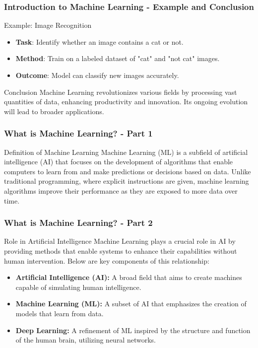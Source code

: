 \documentclass[aspectratio=169]{beamer}
\begin{document}
\begin{frame}[fragile]
    \frametitle{Introduction to Machine Learning - Example and Conclusion}
    \begin{block}{Example: Image Recognition}
        \begin{itemize}
            \item \textbf{Task}: Identify whether an image contains a cat or not.
            \item \textbf{Method}: Train on a labeled dataset of "cat" and "not cat" images.
            \item \textbf{Outcome}: Model can classify new images accurately.
        \end{itemize}
    \end{block}
    \begin{block}{Conclusion}
        Machine Learning revolutionizes various fields by processing vast quantities of data, enhancing productivity and innovation. Its ongoing evolution will lead to broader applications.
    \end{block}
\end{frame}

\begin{frame}[fragile]
    \frametitle{What is Machine Learning? - Part 1}
    \begin{block}{Definition of Machine Learning}
        Machine Learning (ML) is a subfield of artificial intelligence (AI) that focuses on the development of algorithms that enable computers to learn from and make predictions or decisions based on data. Unlike traditional programming, where explicit instructions are given, machine learning algorithms improve their performance as they are exposed to more data over time.
    \end{block}
\end{frame}

\begin{frame}[fragile]
    \frametitle{What is Machine Learning? - Part 2}
    \begin{block}{Role in Artificial Intelligence}
        Machine Learning plays a crucial role in AI by providing methods that enable systems to enhance their capabilities without human intervention. Below are key components of this relationship:
    \end{block}
    \begin{itemize}
        \item \textbf{Artificial Intelligence (AI):} A broad field that aims to create machines capable of simulating human intelligence.
        \item \textbf{Machine Learning (ML):} A subset of AI that emphasizes the creation of models that learn from data.      
        \item \textbf{Deep Learning:} A refinement of ML inspired by the structure and function of the human brain, utilizing neural networks.
    \end{itemize}
\end{frame}
\end{document}
